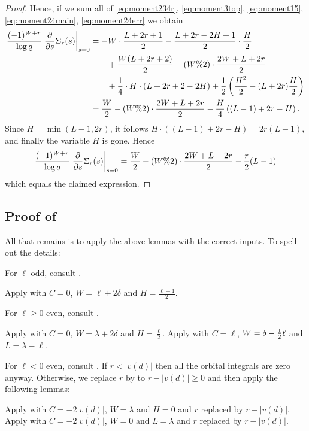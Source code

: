 \begin{proof}
  Hence, if we sum all of \eqref{eq:moment234r}, \eqref{eq:moment3top},
  \eqref{eq:moment15}, \eqref{eq:moment24main}, \eqref{eq:moment24err} we obtain
  \begin{align*}
    \frac{(-1)^{W+r}}{\log q} \left. \pdv{}{s} \Sigma_r(s) \right\rvert_{s=0}
    &= - W \cdot \frac{L+2r+1}{2} - \frac{L+2r-2H+1}{2} \cdot \frac H2 \\
    &\qquad+ \frac{W(L+2r+2)}{2} - (W\%2) \cdot \frac{2W+L+2r}{2} \\
    &\qquad+ \frac14 \cdot H \cdot (L + 2r + 2 - 2H) + \frac{1}{2} \left( \frac{H^2}{2} - (L+2r) \frac H2 \right) \\
    &= \frac{W}{2} - (W\%2) \cdot \frac{2W+L+2r}{2} - \frac{H}{4} \left( (L-1) + 2r - H  \right).
  \end{align*}
  Since $H = \min(L-1, 2r)$, it follows $H \cdot \left( (L-1)+2r-H \right) = 2r(L-1)$,
  and finally the variable $H$ is gone.
  Hence
  \[ \frac{(-1)^{W+r}}{\log q} \left. \pdv{}{s} \Sigma_r(s) \right\rvert_{s=0}
    = \frac{W}{2} - (W\%2) \cdot \frac{2W+L+2r}{2} - \frac r2 (L-1) \]
  which equals the claimed expression.
\end{proof}

\subsection{Proof of }
All that remains is to apply the above lemmas with the correct inputs.
To spell out the details:
\begin{itemize}
  \ii For $\ell$ odd, consult .
  \begin{itemize}
    \ii Apply  with $C = 0$, $W = \ell + 2 \delta$ and $H = \frac{\ell-1}{2}$.
  \end{itemize}

  \ii For $\ell \ge 0$ even, consult .
  \begin{itemize}
    \ii Apply  with $C = 0$, $W = \lambda + 2 \delta$ and $H = \frac{\ell}{2}$.
    \ii Apply  with $C = \ell$, $W = \delta - \frac{1}{2}\ell$ and $L = \lambda - \ell$.
  \end{itemize}

  \ii For $\ell < 0$ even, consult .
  If $r < |v(d)|$ then all the orbital integrals are zero anyway.
  Otherwise, we replace $r$ by to $r-|v(d)| \ge 0$
  and then apply the following lemmas:
  \begin{itemize}
    \ii Apply  with $C = -2|v(d)|$, $W = \lambda$ and $H = 0$
    and $r$ replaced by $r - |v(d)|$.
    \ii Apply  with $C = -2|v(d)|$, $W = 0$ and $L = \lambda$
    and $r$ replaced by $r - |v(d)|$.
  \end{itemize}
\end{itemize}
